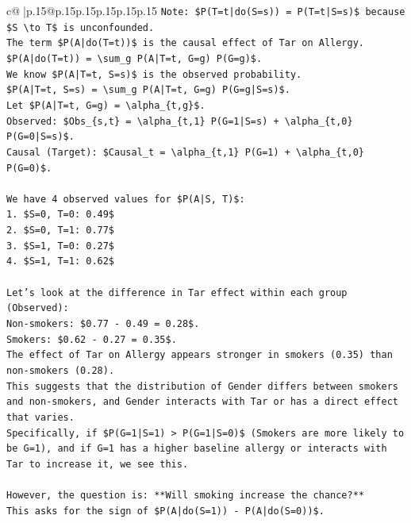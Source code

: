 \documentclass{article}
\begin{document}
{\begin{supertabular}{c@{$\;$}|p{.15\linewidth}@{}p{.15\linewidth}p{.15\linewidth}p{.15\linewidth}p{.15\linewidth}p{.15\linewidth}}
{{{\texttt{Note: \$P(T=t|do(S=s)) = P(T=t|S=s)\$ because \$S \textbackslash{}to T\$ is unconfounded.} \\
\texttt{The term \$P(A|do(T=t))\$ is the causal effect of Tar on Allergy.} \\
\texttt{\$P(A|do(T=t)) = \textbackslash{}sum\_g P(A|T=t, G=g) P(G=g)\$.} \\
\texttt{We know \$P(A|T=t, S=s)\$ is the observed probability.} \\
\texttt{\$P(A|T=t, S=s) = \textbackslash{}sum\_g P(A|T=t, G=g) P(G=g|S=s)\$.} \\
\texttt{Let \$P(A|T=t, G=g) = \textbackslash{}alpha\_\{t,g\}\$.} \\
\texttt{Observed: \$Obs\_\{s,t\} = \textbackslash{}alpha\_\{t,1\} P(G=1|S=s) + \textbackslash{}alpha\_\{t,0\} P(G=0|S=s)\$.} \\
\texttt{Causal (Target): \$Causal\_t = \textbackslash{}alpha\_\{t,1\} P(G=1) + \textbackslash{}alpha\_\{t,0\} P(G=0)\$.} \\
\\ 
\texttt{We have 4 observed values for \$P(A|S, T)\$:} \\
\texttt{1. \$S=0, T=0: 0.49\$} \\
\texttt{2. \$S=0, T=1: 0.77\$} \\
\texttt{3. \$S=1, T=0: 0.27\$} \\
\texttt{4. \$S=1, T=1: 0.62\$} \\
\\ 
\texttt{Let's look at the difference in Tar effect within each group (Observed):} \\
\texttt{Non{-}smokers: \$0.77 {-} 0.49 = 0.28\$.} \\
\texttt{Smokers: \$0.62 {-} 0.27 = 0.35\$.} \\
\texttt{The effect of Tar on Allergy appears stronger in smokers (0.35) than non{-}smokers (0.28).} \\
\texttt{This suggests that the distribution of Gender differs between smokers and non{-}smokers, and Gender interacts with Tar or has a direct effect that varies.} \\
\texttt{Specifically, if \$P(G=1|S=1) > P(G=1|S=0)\$ (Smokers are more likely to be G=1), and if G=1 has a higher baseline allergy or interacts with Tar to increase it, we see this.} \\
\\ 
\texttt{However, the question is: **Will smoking increase the chance?**} \\
\texttt{This asks for the sign of \$P(A|do(S=1)) {-} P(A|do(S=0))\$.} \\
}}}
\end{supertabular}}
\end{document}
